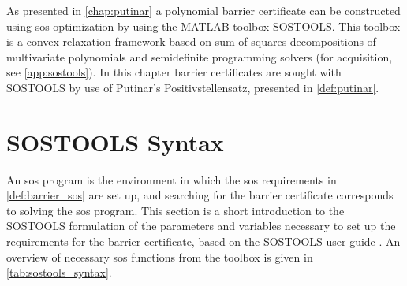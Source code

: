 As presented in \autoref{chap:putinar} a polynomial barrier certificate can be constructed using \gls{sos} optimization by using the MATLAB toolbox SOSTOOLS. This toolbox is a convex relaxation framework based on sum of squares decompositions of multivariate polynomials and semidefinite programming solvers \citep{bib:prajna_framework} (for acquisition, see \autoref{app:sostools}).
In this chapter barrier certificates are sought with SOSTOOLS by use of Putinar's Positivstellensatz, presented in \autoref{def:putinar}.


\section{SOSTOOLS Syntax}
\vspace{-2mm}
An \gls{sos} program is the environment in which the \gls{sos} requirements in \autoref{def:barrier_sos} are set up, and searching for the barrier certificate corresponds to solving the \gls{sos} program.
This section is a short introduction to the SOSTOOLS formulation of the parameters and variables necessary to set up the requirements for the barrier certificate, based on the SOSTOOLS user guide \citep{bib:sostools_manual}.  
An overview of necessary \gls{sos} functions from the toolbox is given in \autoref{tab:sostools_syntax}.

